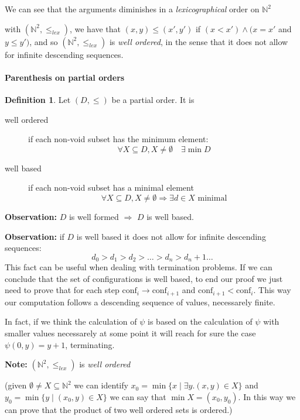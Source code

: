 \documentclass{amsbook}
\newcommand{\nat}{\ensuremath{\mathbb{N}}}
\theoremstyle{definition}
\newtheorem{definition}[theorem]{Definition}
\theoremstyle{remark}
\numberwithin{section}{chapter}
\numberwithin{equation}{chapter}
\begin{document}
We can see that the arguments diminishes in a \emph{lexicographical}
order on $\mathbb{N}^2$

with $(\mathbb{N}^2, \leq_{lex} )$, we have that $(x,y) \leq (x', y')$
if $(x < x') \wedge (x=x'$ and $y \leq y')$, and so
$( \mathbb{N}^2, \leq_{lex} )$ is \emph{well ordered}, in the sense
that it does not allow for infinite descending sequences.

\paragraph{Parenthesis on partial orders}
\begin{definition}
  Let $(D, \leq)$ be a partial order. It is
  \begin{description}
  \item[well ordered] if each non-void subset has the minimum element:
    $$\forall X \subseteq D, X \neq \emptyset \quad \exists \min D$$
  \item[well based] if each non-void subset has a minimal element
    $$ \forall X \subseteq D, X \neq \emptyset \Rightarrow \exists d \in X \text{ minimal}$$
  \end{description}
\end{definition}

\textbf{Observation:} $D$ is well formed $\Rightarrow$ $D$ is well
based.

\textbf{Observation:} if $D$ is well based it does not allow for
infinite descending sequences:
\[
  d_0 > d_1 > d_2 > \dots > d_n > d_n+1 \dots
\]
\newcommand{\conf}{\text{conf}} This fact can be useful when dealing
with termination problems. If we can conclude that the set of
configurations is well based, to end our proof we just need to prove
that for each step \( \conf _i \rightarrow \conf_{i+1} \) and
\( \conf _{i+1} < \conf _i \). This way our computation follows a descending sequence of values, necessarely finite.

In fact, if we think the calculation of $\psi$ is based on the
calculation of $\psi$ with smaller values necessarely at some point it
will reach for sure the case $\psi(0,y) = y + 1$, terminating.

\textbf{Note:} $(\nat^2, \leq_{lex})$ is \emph{well ordered}

(given $\emptyset \neq X \subseteq \nat^2$ we can identify
$x_0 = \min\{x \; | \; \exists y.(x,y) \in X\}$ and
$y_0 = \min \{ y \; | \; (x_0,y) \in X\}$ we can say that
$\min X = (x_0, y_0)$. In this way we can prove that the product of
two well ordered sets is ordered.)
\end{document}
